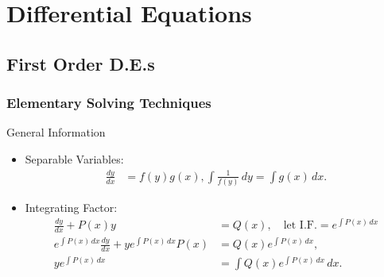 \documentclass[oneside]{book}
\begin{document}
\chapter{Differential Equations}
\section{First Order D.E.s}
\subsection{Elementary Solving Techniques}
\begin{stbox}{General Information}
  \begin{itemize}
    \item Separable Variables:
    \begin{align*}
      \frac{dy}{dx}&=f(y)g(x),
      \int \frac{1}{f(y)}\,dy=\int g(x)\,dx.
    \end{align*}
    \item Integrating Factor:
    \begin{align*}
      \frac{dy}{dx}+P(x)y&=Q(x),\quad\text{let I.F.}=e^{\int P(x)\,dx}\\
      e^{\int P(x)\,dx} \frac{dy}{dx}+ye^{\int P(x)\,dx}P(x)&=Q(x)e^{\int P(x)\,dx},\\
      ye^{\int P(x)\,dx}&=\int Q(x)e^{\int P(x)\,dx}\,dx.
    \end{align*}
  \end{itemize}
\end{stbox}
\end{document}
